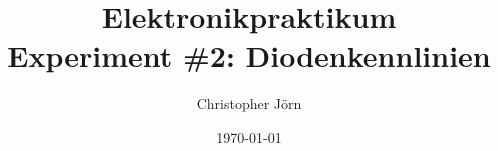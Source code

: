\title{Elektronikpraktikum\\ Experiment \#2: Diodenkennlinien}
\author{Christopher Jörn}
\date{\today}